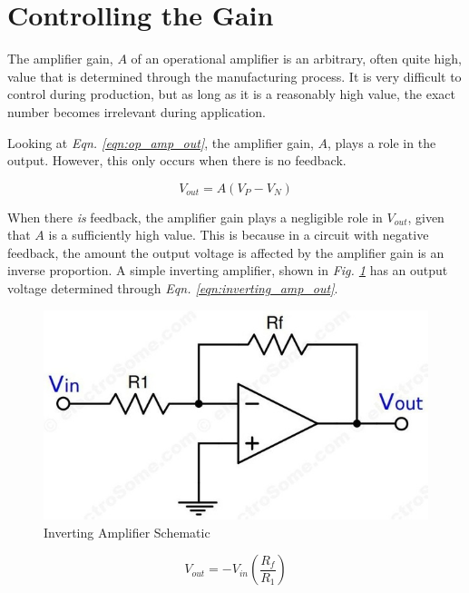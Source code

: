 \documentclass[journal]{IEEEtran}
\begin{document}
\section{Controlling the Gain}
The amplifier gain, $A$ of an operational amplifier is an arbitrary, often quite high, value that is determined through the manufacturing process. It is very difficult to control during production, but as long as it is a reasonably high value, the exact number becomes irrelevant during application.

Looking at \textit{Eqn. \ref{eqn:op_amp_out}}, the amplifier gain, $A$, plays a role in the output. However, this only occurs when there is no feedback. 

\begin{equation}
    V_{out} = A(V_P - V_N)
    \label{eqn:op_amp_out}
\end{equation}

When there \textit{is} feedback, the amplifier gain plays a negligible role in $V_{out}$, given that $A$ is a sufficiently high value. This is because in a circuit with negative feedback, the amount the output voltage is affected by the amplifier gain is an inverse proportion. A simple inverting amplifier, shown in \textit{Fig. \ref{fig:sch_inverting_amp}} has an output voltage determined through \textit{Eqn. \ref{eqn:inverting_amp_out}}.

\begin{figure}[h]
    \includegraphics[scale=0.4]{Media/main-qimg-ff6c97a856f809327a49099f4cc0167e.jpeg}
    \caption[short]{Inverting Amplifier Schematic}
    \label{fig:sch_inverting_amp}
\end{figure}

\begin{equation}
    V_{out} = -V_{in}\left(\frac{R_f}{R_1}\right)
    \label{eqn:inverting_amp_out}
\end{equation}
\end{document}
